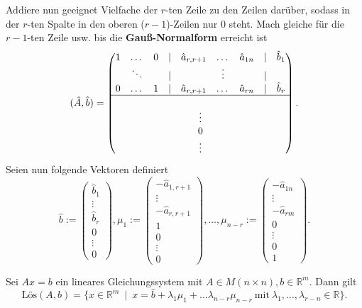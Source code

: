 Addiere nun geeignet Vielfache der $r$-ten Zeile zu den Zeilen darüber, sodass
in der $r$-ten Spalte in den oberen ($r-1$)-Zeilen nur 0 steht. Mach gleiche
für die $r-1$-ten Zeile usw. bis die \textbf{Gauß-Normalform} erreicht ist
\[
    (\hat{A}, \hat{b}) = \begin{pmatrix}
        1 & \dots & 0 & \mid & \hat{a}_{r,r+1} & \dots & \hat{a}_{1n} &\mid & \hat{b}_1\\
        & \ddots & & \mid & & \vdots & & \mid\\
        0 & \dots & 1 & \mid & \hat{a}_{r,r+1} & \dots &  \hat{a}_{rn} & \mid & \hat{b}_r\\
        \hline\\
        \multicolumn{9}{c}{\vdots}\\
        \multicolumn{9}{c}{0}\\
        \multicolumn{9}{c}{\vdots}
    \end{pmatrix} 
.\]
Seien nun folgende Vektoren definiert
\[
    \hat{b}:=\begin{pmatrix}
        \hat{b}_1\\
        \vdots\\
        \hat{b}_r\\
        0\\
        \vdots\\
        0
    \end{pmatrix},
    \mu_1 := \begin{pmatrix}
        -\hat{a}_{1,r+1}\\
        \vdots\\
        -\hat{a}_{r,r+1}\\
        1\\
        0\\
        \vdots\\
        0
    \end{pmatrix},\dots,
    \mu_{n-r} := \begin{pmatrix}
        -\hat{a}_{1n}\\
        \vdots\\
        -\hat{a}_{rm}\\
        0\\
        \vdots\\
        0\\
        1
    \end{pmatrix}
.\]
\begin{theorem}
    Sei $Ax = b$ ein lineares Gleichungssystem mit $A\in M(n\times n), b\in \mathbb{R}^m$.
    Dann gilt
    \[
        \text{Lös}(A,b)=\{ x \in \mathbb{R}^m\ \mid\ x = \hat{b} + \lambda_1\mu_1 + \dots \lambda_{n-r}\mu_{n-r}\ \text{mit}\ \lambda_1,\dots,\lambda_{r-n} \in \mathbb{R} \}    
    .\]
\end{theorem}